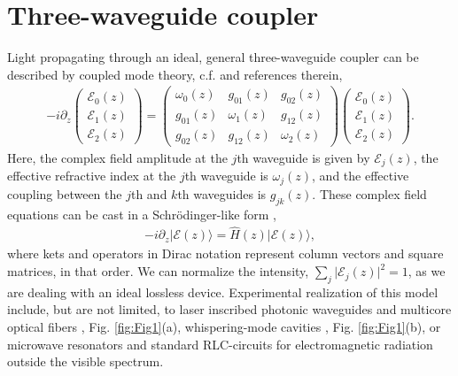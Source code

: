 \documentclass[9pt,twocolumn,twoside]{osajnl}
\begin{document}
\section{Three-waveguide coupler}

Light propagating through an ideal, general three-waveguide coupler can be described by coupled mode theory, c.f. \cite{RodriguezLara2015p068014} and references therein,
\begin{eqnarray}
-i \partial_{z} \left( \begin{array}{c} \mathcal{E}_{0}(z) \\ \mathcal{E}_{1}(z) \\  \mathcal{E}_{2}(z) \end{array} \right) =  \left( \begin{array}{ccc} 
\omega_{0}(z)  & g_{01}(z) & g_{02}(z) \\
g_{01}(z) & \omega_{1}(z) & g_{12}(z) \\
g_{02}(z) & g_{12}(z) & \omega_{2}(z)
\end{array} \right) \left( \begin{array}{c} \mathcal{E}_{0}(z) \\ \mathcal{E}_{1}(z) \\  \mathcal{E}_{2}(z) \end{array} \right).
\end{eqnarray}
Here, the complex field amplitude at the $j$th waveguide is given by $\mathcal{E}_{j}(z)$, the effective refractive index at the $j$th waveguide is $\omega_{j}(z)$, and the effective coupling between the $j$th and $k$th waveguides is $g_{jk}(z)$.
These complex field equations can be cast in a Schr\"odinger-like form \cite{RodriguezLara2015p068014},
\begin{eqnarray}
- i \partial_{z} \vert \mathcal{E}(z) \rangle = \hat{H}(z) \vert \mathcal{E}(z) \rangle,\label{eq:diff}
\end{eqnarray}
where kets and operators in Dirac notation represent column vectors and square matrices, in that order.
We can normalize the intensity, $\sum_{j} \vert \mathcal{E}_{j}(z) \vert^2 =1$, as we are dealing with an ideal lossless device.
Experimental realization of this model include, but are not limited, to laser inscribed photonic waveguides \cite{Szameit2010p163001} and  multicore optical fibers \cite{}, Fig. \ref{fig:Fig1}(a), whispering-mode cavities \cite{}, Fig. \ref{fig:Fig1}(b), or microwave resonators \cite{FrancoVillafane2013p170405} and standard RLC-circuits \cite{} for electromagnetic radiation outside the visible spectrum.
\end{document}
